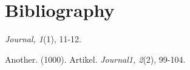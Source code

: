 \documentclass{article}
\begin{document}
  











\section{Bibliography}

\emph{Journal, 1}(1), 11-12.

Another. (1000). Artikel. \emph{Journal1, 2}(2), 99-104.
\end{document}
